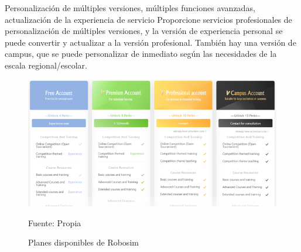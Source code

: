Personalización de múltiples versiones, múltiples funciones avanzadas, actualización de la experiencia de servicio
Proporcione servicios profesionales de personalización de múltiples versiones, y la versión de experiencia personal se puede convertir y actualizar a la versión profesional.
También hay una versión de campus, que se puede personalizar de inmediato según las necesidades de la escala regional/escolar.

\begin{figure}[H]
    \centering
    \includegraphics[scale = 0.50]{Imagenes/planes.png}
    \caption{Planes disponibles de Robosim}{Fuente: Propia}
\end{figure}